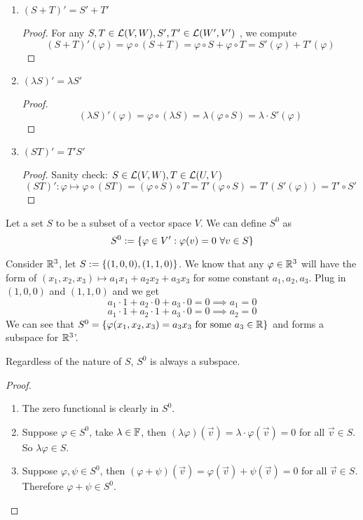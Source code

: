 \begin{remark} $ $
    \vspace{-0.5cm}
    \begin{enumerate}
        \item $(S + T)'  = S' + T'$
        \begin{proof}
            For any $S,T \in \mathcal L(V,W), S', T' \in \mathcal L(W',V')$ , we compute 
            \[(S + T)'(\varphi) = \varphi \circ (S + T) = \varphi \circ S + \varphi \circ T = S'(\varphi) + T'(\varphi)\]
        \end{proof}
        \item $(\lambda S)' = \lambda S'$
        \begin{proof}
            \[ (\lambda S)'(\varphi) = \varphi \circ (\lambda S) = \lambda (\varphi \circ S) = \lambda \cdot S'(\varphi)\]
        \end{proof}
        \item $(ST)'  = T' S'$
        \begin{proof}
            Sanity check: $S \in \mathcal L(V,W), T \in \mathcal L(U,V)$
            \[ (ST)' : \varphi \mapsto \varphi 
            \circ (ST) = (\varphi \circ S) \circ T = T'(\varphi \circ S) = T'(S'(\varphi)) = T' \circ S'\]
        \end{proof}
    \end{enumerate}
\end{remark}
\begin{definition}[Annihilators]
    Let a set $S$ to be a subset of a vector space $V$. We can define $S^0$ as 
    \[ S^0 := \left\{ \varphi \in V' : \varphi (v) = 0 \ \forall v \in S \right\}\]
\end{definition}
\begin{example}
    Consider $\mathbb R^3$, let $S := \left\{ (1,0,0), (1,1,0) \right\}$. We know that any $\varphi \in \mathbb R^3$ will have the form of $(x_1,x_2,x_3) \mapsto a_1x_1 + a_2x_2 + a_3x_3$ for some constant $a_1,a_2,a_3$. Plug in $(1,0,0)$ and $(1,1,0)$ and we get 
    \[ a_1 \cdot 1 + a_2 \cdot 0 + a_3 \cdot 0 = 0 \implies a_1 = 0\]
    \[ a_1 \cdot 1 + a_2 \cdot 1 + a_3 \cdot 0 = 0 \implies a_2 = 0\]
    We can see that $S^{0} = \left\{ \varphi(x_1, x_2, x_3) = a_3 x_3 \text{ for some } a_3 \in \mathbb R \right\}$ and forms a subspace for $\mathbb R^{3}$'.
\end{example}
\begin{lemma}
    Regardless of the nature of $S$, $S^0$ is always a subspace.
\end{lemma}
\newpage
\begin{proof}
    \begin{enumerate}
        \item The zero functional is clearly in $S^0$.
        \item Suppose $\varphi \in S^0$, take $\lambda \in \mathbb F$, then $(\lambda \varphi)(\vec v) = \lambda \cdot \varphi(\vec v) = 0$ for all $\vec v \in S$. So $\lambda \varphi \in S$.
        \item Suppose $\varphi, \psi \in S^0$, then $(\varphi + \psi)(\vec v) = \varphi(\vec v) + \psi(\vec v) = 0$ for all $\vec v \in S$. Therefore $\varphi + \psi \in S^0$.
    \end{enumerate}
\end{proof}
